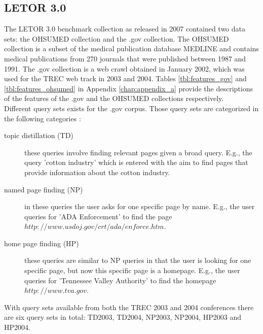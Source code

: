 \subsection{LETOR 3.0}
The LETOR 3.0 benchmark collection \cite{Qin2010} as released in 2007 contained two data sets: the OHSUMED collection and the .gov collection. The OHSUMED collection is a subset of the medical publication database MEDLINE and contains medical publications from 270 journals that were published between 1987 and 1991. The .gov collection is a web crawl obtained in January 2002, which was used for the \ac{TREC} web track in 2003 and 2004. Tables \ref{tbl:features_gov} and \ref{tbl:features_ohsumed} in Appendix \ref{chap:appendix_a} provide the descriptions of the features of the .gov and the OHSUMED collections respectively.\\

Different query sets exists for the .gov corpus. Those query sets are categorized in the following categories \cite{Craswell2003}:
\begin{description}
\item[topic distillation (TD)]these queries involve finding relevant pages given a broad query. E.g., the query 'cotton industry' which is entered with the aim to find pages that provide information about the cotton industry.
\item[named page finding (NP)]in these queries the user asks for one specific page by name. E.g., the user queries for 'ADA Enforcement' to find the page $http://www.usdoj.gov/crt/ada/enforce.htm$.
\item[home page finding (HP)]these queries are similar to NP queries in that the user is looking for one specific page, but now this specific page is a homepage. E.g., the user queries for 'Tennessee Valley Authority' to find the homepage $http://www.tva.gov$.
\end{description}
With query sets available from both the \ac{TREC} 2003 and 2004 conferences there are six query sets in total: TD2003, TD2004, NP2003, NP2004, HP2003 and HP2004.\\

